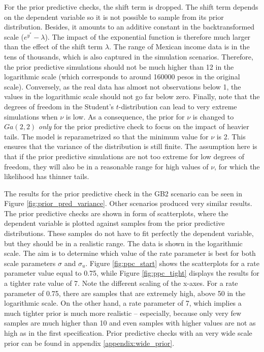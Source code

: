 For the prior predictive checks, the shift term is dropped.
The shift term depends on the dependent variable so it is not possible to sample from its prior distribution.
Besides, it amounts to an additive constant in the backtransformed scale ($e^{y^*} - \lambda$). The impact of the exponential function is therefore much larger than the effect of the shift term $\lambda$.
The range of Mexican income data is in the tens of thousands, which is also captured in the simulation scenarios.
Therefore, the prior predictive simulations should not be much higher than 12 in the logarithmic scale (which corresponds to around 160000 pesos in the original scale).
Conversely, as the real data has almost not observations below 1, the values in the logarithmic scale should not go far below zero.
Finally, note that the degrees of freedom in the Student's $t$-distribution can lead to very extreme simulations when $\nu$ is low.
As a consequence, the prior for $\nu$ is changed to $Ga(2, 2)$ \textit{only} for the prior predictive check to focus on the impact of heavier tails.
The model is reparametrized so that the minimum value for $\nu$ is 2. This ensures that the variance of the distribution is still finite.
The assumption here is that if the prior predictive simulations are not too extreme for low degrees of freedom, they will also be in a reasonable range for high values of $\nu$, for which the likelihood has thinner tails.


The results for the prior predictive check in the GB2 scenario can be seen in Figure \ref{fig:prior_pred_variance}.
Other scenarios produced very similar results.
The prior predictive checks are shown in form of scatterplots, where the dependent variable is plotted against samples from the prior predictive distributions.
These samples do not have to fit perfectly the dependent variable, but they should be in a realistic range.
The data is shown in the logarithmic scale.
The aim is to determine which value of the rate parameter is best for both scale parameters $\sigma$ and $\sigma_u$.
Figure \ref{fig:ppc_start} shows the scatterplots for a rate parameter value equal to 0.75, while Figure \ref{fig:ppc_tight} displays the results for a tighter rate value of 7.
Note the different scaling of the x-axes.
For a rate parameter of 0.75, there are samples that are extremely high, above 50 in the logarithmic scale.
On the other hand, a rate parameter of 7, which implies a much tighter prior is much more realistic – especially, because only very few samples are much higher than 10 and even samples with higher values are not as high as in the first specification.
Prior predictive checks with an very wide scale prior can be found in appendix \ref{appendix:wide_prior}.

